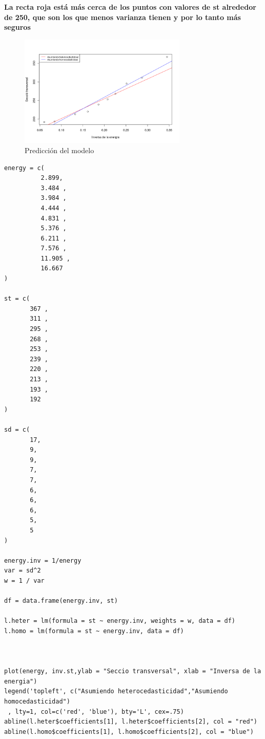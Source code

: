 \documentclass[a4paper]{article}
\begin{document}
\textbf{La recta roja está más cerca de los puntos con valores de st alrededor
de 250, que son los que menos varianza tienen y por lo tanto más seguros}


\begin{center}
\begin{figure}[h]
\includegraphics[width=8cm]{plot}
\caption{Predicción del modelo}
\label{f1}
\end{figure}
\end{center}


\begin{lstlisting}
energy = c(
          2.899,
          3.484 ,
          3.984 ,
          4.444 ,
          4.831 ,
          5.376 ,
          6.211 ,
          7.576 ,
          11.905 ,
          16.667
)

st = c(
       367 ,
       311 ,
       295 ,
       268 ,
       253 ,
       239 ,
       220 ,
       213 ,
       193 ,
       192
)

sd = c(
       17,
       9,
       9,
       7,
       7,
       6,
       6,
       6,
       5,
       5
)

energy.inv = 1/energy
var = sd^2
w = 1 / var

df = data.frame(energy.inv, st)

l.heter = lm(formula = st ~ energy.inv, weights = w, data = df)
l.homo = lm(formula = st ~ energy.inv, data = df)



plot(energy, inv.st,ylab = "Seccio transversal", xlab = "Inversa de la energia")
legend('topleft', c("Asumiendo heterocedasticidad","Asumiendo homocedasticidad")
 , lty=1, col=c('red', 'blue'), bty='L', cex=.75)
abline(l.heter$coefficients[1], l.heter$coefficients[2], col = "red")
abline(l.homo$coefficients[1], l.homo$coefficients[2], col = "blue")



\end{lstlisting}
\end{document}
